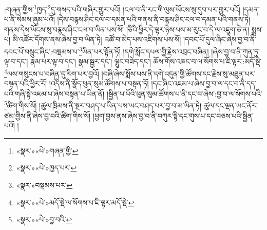 :གཞན་གྱིས་\footnote{«སྣར་»«པེ་»གཞན་གྱི་}ཁྱད་\footnote{«སྣར་»«པེ་»ཁྱད་པར་}དུ་གསད་པའི་གཞིར་གྱུར་པའོ། །ངལ་བ་ནི་རང་གི་ལུས་ཡོངས་སུ་དུབ་པར་གྱུར་པའོ། །དམན་པ་ནི་སེམས་ཞུམ་པའོ། །དེས་བརྙས་ཤིང་ངལ་བ་དམན་པའི་གནས་ནི་བརྙས་ཤིང་ངལ་བ་དམན་པའི་གནས་ཏེ། གནས་དེས་ཡོངས་སུ་བརྙས་ཤིང་ངལ་བ་ཡིན་པས་སོ། །ཅིའི་ཕྱིར་དེ་ལྟར་ཉེས་པས་མ་རུང་བ་དེ་ལ་འཇུག་ཅེ་ན། སྨྲས་པ། མི་འཚོར་དོགས་ནས་ཞེས་བྱ་བ་ཡིན་ཏེ། འཚོ་བ་མེད་པས་འཇིགས་པས་སོ། །དབང་པོ་དུལ་ཞིང་ཞེས་བྱ་བ་ནི་དབང་པོ་བསྲུང་ཞིང་:བསྡམས་པ་\footnote{«སྣར་»བསྡམས་པར་}ཡིན་པར་སྟོན་ཏོ། །དགེ་སློང་དཔལ་གྱི་རྗེས་འབྲང་བཞིན། །ཞེས་བྱ་བ་ནི་ཀུན་ཏུ་ལྟ་བ་དང་། རྣམ་པར་ལྟ་བ་དང་། སྣམ་སྦྱར་དང་། ལྷུང་བཟེད་དང་། ཆོས་གོས་འཆང་བ་ལ་སོགས་པ་ཇི་ལྟར་:མདོ་སྡེ་\footnote{«སྣར་»«པེ་»མདོ་སྡེ་ལ་སོགས་པ་ཇི་ལྟར་མདོ་སྡེ་}ལས་གསུངས་པ་བཞིན་དུ་རིག་པར་བྱའོ། །བཞི་ཞེས་སྨོས་པས་ནི་དགེ་འདུན་གྱི་ཚོགས་དང་རྗེས་སུ་མཐུན་པར་བསྟན་པའི་ཕྱིར་རོ། །འདིས་ནི་སྣོད་ཕུན་སུམ་ཚོགས་པ་བསྟན་ཏོ། །དང་ཞིང་འཇམ་པ་ཞེས་བྱ་བ་ལ་དང་བ་ནི་དད་པའི་གཞི་སྟེ་འཇམ་པ་ཞེས་བསྟན་པ་ཡིན་ནོ། །སྦྱིན་པ་པོའི་ཕུན་སུམ་ཚོགས་པ་ནི་དང་བ་ཞེས་:བྱ་བ་ལ་སོགས་པའི་\footnote{«སྣར་»«པེ་»བྱ་བའི་}ཚིག་གིས་སོ། །ཚུལ་ཁྲིམས་ནི་སྔར་བཤད་པ་ཡིན་པས་ཡང་བཤད་པར་བྱ་བ་མ་ཡིན་ཏེ། ཚུལ་དང་ལྡན་ཡང་ནོར་ཙམ་གྱིས་ནི་ཞེས་བྱ་བའི་ཚིག་གིས་སོ། །ཕྱག་བྱས་ནས་ཞེས་བྱ་བ་ནི་བཀུར་སྟི་དང་གུས་པ་དང་བཅས་པའི་སྦྱིན་པའོ། །
